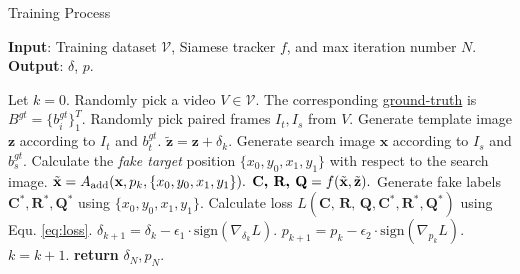 \documentclass[journal]{IEEEtran}
\begin{document}
\begin{algorithm}[tb]
  \small
  \caption{Training Process}
  \label{alg:algorithm}
  \textbf{Input}: Training dataset $\mathcal{V}$, Siamese tracker $f$, and max iteration number $N$.\\
  \textbf{Output}: $\delta$, $p$.
  \begin{algorithmic}[1] %
  \STATE Let $k = 0$.
  \STATE Randomly pick a video $V\in \mathcal{V}$. The corresponding \uline{ground-truth} is $B^{gt}=\{b^{gt}_i\}^T_1$.
  \STATE Randomly pick paired frames $I_t, I_s$ from $V$.
  \STATE Generate template image $\textbf{z}$ according to $I_t$ and $b^{gt}_t$.
  \STATE $\tilde{\textbf{z}} = \textbf{z} + \delta_k.$
  \STATE Generate search image $\textbf{x}$ according to $I_s$ and $b^{gt}_s$.
  \STATE Calculate the \textit{fake target} position $\{x_0, y_0, x_1, y_1\}$ with respect to the search image.
  \STATE $\tilde{\textbf x} = A_{\text{add}}(\textbf x, p_k, \{x_0, y_0, x_1, y_1\}).$
  \STATE $\textbf{C, R, Q} = f(\tilde {\textbf x}, \tilde{\textbf z}).$
  \STATE Generate fake labels $\textbf{C}^*,\textbf{R}^*,\textbf{Q}^*$ using $\{x_0, y_0, x_1, y_1\}$.
  \STATE Calculate loss $L(\textbf{C, R, Q}, \textbf{C}^*, \textbf{R}^*, \textbf{Q}^*)$ using Equ. \ref{eq:loss}.
  \STATE $\delta_{k+1} = \delta_{k} - \epsilon_1 \cdot \text{sign}(\nabla_{\delta_k}L).$
  \STATE $p_{k+1} = p_{k} - \epsilon_2 \cdot \text{sign}(\nabla_{p_k}L).$
  \STATE $k = k + 1.$
  \ENDWHILE
  \STATE \textbf{return} $\delta_N, p_N.$
  \end{algorithmic}
  \label{alg}
\end{algorithm}
  
\end{document}
